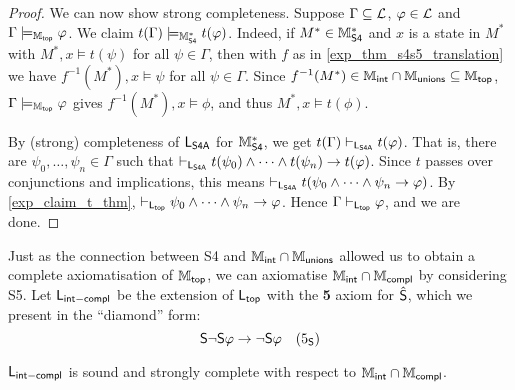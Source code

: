 \begin{proof}
We can now show strong completeness. Suppose $\Gamma \subseteq \cL$, $\phi \in
\cL$ and $\Gamma \models_{\Mtop} \phi$. We claim $t(\Gamma) \models_{\Msfour}
t(\phi)$. Indeed, if $M^* \in \Msfour$ and $x$ is a state in $M^*$ with $M^*, x
\models t(\psi)$ for all $\psi \in \Gamma$, then with $f$ as in
\cref{exp_thm_s4s5_translation} we have $f^{-1}(M^*), x \models \psi$ for all $\psi
\in \Gamma$. Since $f^{-1}(M^*) \in \Mint \cap \Munions \subseteq \Mtop$,
$\Gamma \models_{\Mtop} \phi$ gives $f^{-1}(M^*), x \models \phi$, and thus
$M^*, x \models t(\phi)$.

By (strong) completeness of $\sLsfoura$ for $\Msfour$, we get $t(\Gamma)
\entails_{\sLsfoura} t(\phi)$. That is, there are $\psi_0, \ldots, \psi_n \in
\Gamma$ such that $\entails_{\sLsfoura} t(\psi_0) \land \cdots \land t(\psi_n)
\limplies t(\phi)$. Since $t$ passes over conjunctions and implications, this
means $\entails_{\sLsfoura} t(\psi_0 \land \cdots \land \psi_n \limplies
\phi)$. By \cref{exp_claim_t_thm}, $\entails_{\sLtop} \psi_0 \land \cdots \land
\psi_n \limplies \phi$. Hence $\Gamma \entails_{\sLtop} \phi$, and we are done.
\end{proof}

Just as the connection between S4 and $\Mint \cap \Munions$ allowed us
to obtain a complete axiomatisation of $\Mtop$, we can axiomatise $\Mint \cap
\Mcompl$ by considering S5. Let $\sLintcompl$ be the extension of $\sLtop$
with the \textbf{5} axiom for $\hat\S$, which we present in the ``diamond''
form:
\[
    \S\neg\S\phi \limplies \neg\S\phi
    \quad
    \fivesoundness
\]

\begin{theorem}
\label{exp_thm_mintcompl_axiomatisation}
$\sLintcompl$ is sound and strongly complete with respect to
$\Mint \cap \Mcompl$.
\end{theorem}

